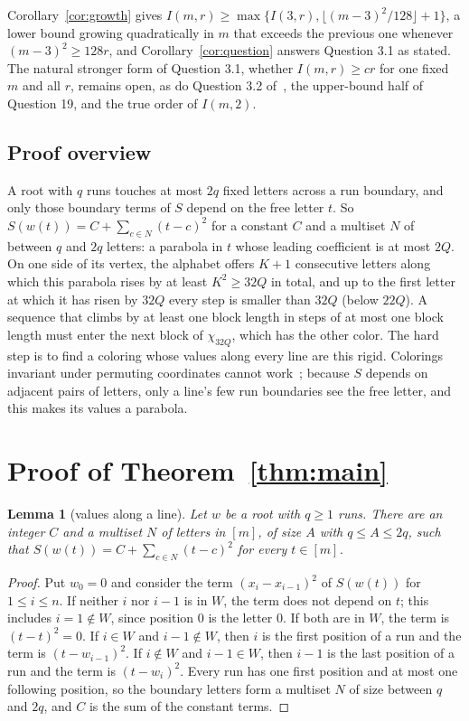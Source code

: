 \documentclass[11pt]{article}
\newtheorem{lemma}{Lemma}
\theoremstyle{remark}
\begin{document}
Corollary~\ref{cor:growth} gives $I(m,r)\ge\max\{I(3,r),\lfloor(m-3)^2/128\rfloor+1\}$, a lower bound growing quadratically in $m$ that exceeds the previous one whenever $(m-3)^2\ge128r$, and Corollary~\ref{cor:question} answers Question 3.1 as stated. The natural stronger form of Question 3.1, whether $I(m,r)\ge cr$ for one fixed $m$ and all $r$, remains open, as do Question 3.2 of~\cite{CK}, the upper-bound half of Question 19, and the true order of $I(m,2)$.

\subsection{Proof overview}

A root with $q$ runs touches at most $2q$ fixed letters across a run boundary, and only those boundary terms of $S$ depend on the free letter $t$. So $S(w(t))=C+\sum_{c\in N}(t-c)^2$ for a constant $C$ and a multiset $N$ of between $q$ and $2q$ letters: a parabola in $t$ whose leading coefficient is at most $2Q$. On one side of its vertex, the alphabet offers $K+1$ consecutive letters along which this parabola rises by at least $K^2\ge32Q$ in total, and up to the first letter at which it has risen by $32Q$ every step is smaller than $32Q$ (below $22Q$). A sequence that climbs by at least one block length in steps of at most one block length must enter the next block of $\chi_{32Q}$, which has the other color. The hard step is to find a coloring whose values along every line are this rigid. Colorings invariant under permuting coordinates cannot work~\cite[Proposition 51]{MouhibLB}; because $S$ depends on adjacent pairs of letters, only a line's few run boundaries see the free letter, and this makes its values a parabola.

\section{Proof of Theorem~\ref{thm:main}}

\begin{lemma}[values along a line]\label{lem:line}
Let $w$ be a root with $q\ge1$ runs. There are an integer $C$ and a multiset $N$ of letters in $[m]$, of size $A$ with $q\le A\le2q$, such that $S(w(t))=C+\sum_{c\in N}(t-c)^2$ for every $t\in[m]$.
\end{lemma}

\begin{proof}
Put $w_0=0$ and consider the term $(x_i-x_{i-1})^2$ of $S(w(t))$ for $1\le i\le n$. If neither $i$ nor $i-1$ is in $W$, the term does not depend on $t$; this includes $i=1\notin W$, since position $0$ is the letter $0$. If both are in $W$, the term is $(t-t)^2=0$. If $i\in W$ and $i-1\notin W$, then $i$ is the first position of a run and the term is $(t-w_{i-1})^2$. If $i\notin W$ and $i-1\in W$, then $i-1$ is the last position of a run and the term is $(t-w_i)^2$. Every run has one first position and at most one following position, so the boundary letters form a multiset $N$ of size between $q$ and $2q$, and $C$ is the sum of the constant terms.
\end{proof}
\end{document}
